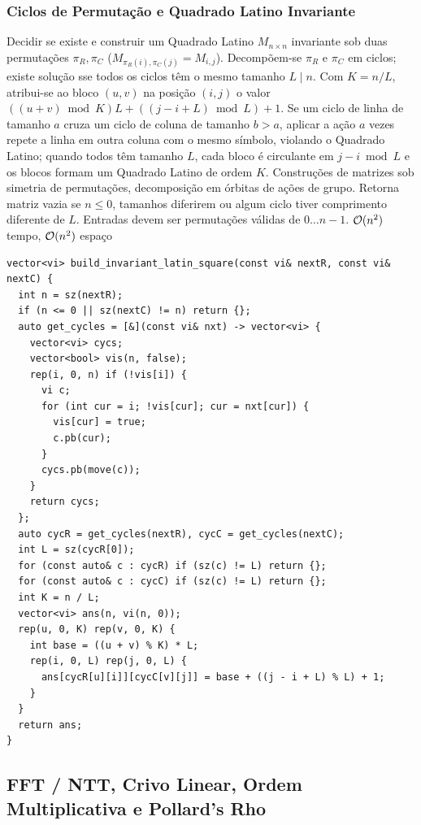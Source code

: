 \subsubsection{Ciclos de Permutação e Quadrado Latino Invariante}
\algobox
  {Decidir se existe e construir um Quadrado Latino $M_{n \times n}$ invariante sob duas permutações $\pi_R, \pi_C$ ($M_{\pi_R(i), \pi_C(j)} = M_{i,j}$).}
  {Decompõem-se $\pi_R$ e $\pi_C$ em ciclos; existe solução sse todos os ciclos têm o mesmo tamanho $L \mid n$. Com $K = n / L$, atribui-se ao bloco $(u, v)$ na posição $(i, j)$ o valor $((u + v) \bmod K) L + ((j - i + L) \bmod L) + 1$.}
  {Se um ciclo de linha de tamanho $a$ cruza um ciclo de coluna de tamanho $b > a$, aplicar a ação $a$ vezes repete a linha em outra coluna com o mesmo símbolo, violando o Quadrado Latino; quando todos têm tamanho $L$, cada bloco é circulante em $j - i \bmod L$ e os blocos formam um Quadrado Latino de ordem $K$.}
  {Construções de matrizes sob simetria de permutações, decomposição em órbitas de ações de grupo.}
  {Retorna matriz vazia se $n \le 0$, tamanhos diferirem ou algum ciclo tiver comprimento diferente de $L$. Entradas devem ser permutações válidas de $0 \dots n-1$.}
  {$\mathcal{O}(n^2)$ tempo, $\mathcal{O}(n^2)$ espaço}

\begin{lstlisting}
vector<vi> build_invariant_latin_square(const vi& nextR, const vi& nextC) {
  int n = sz(nextR);
  if (n <= 0 || sz(nextC) != n) return {};
  auto get_cycles = [&](const vi& nxt) -> vector<vi> {
    vector<vi> cycs;
    vector<bool> vis(n, false);
    rep(i, 0, n) if (!vis[i]) {
      vi c;
      for (int cur = i; !vis[cur]; cur = nxt[cur]) {
        vis[cur] = true;
        c.pb(cur);
      }
      cycs.pb(move(c));
    }
    return cycs;
  };
  auto cycR = get_cycles(nextR), cycC = get_cycles(nextC);
  int L = sz(cycR[0]);
  for (const auto& c : cycR) if (sz(c) != L) return {};
  for (const auto& c : cycC) if (sz(c) != L) return {};
  int K = n / L;
  vector<vi> ans(n, vi(n, 0));
  rep(u, 0, K) rep(v, 0, K) {
    int base = ((u + v) % K) * L;
    rep(i, 0, L) rep(j, 0, L) {
      ans[cycR[u][i]][cycC[v][j]] = base + ((j - i + L) % L) + 1;
    }
  }
  return ans;
}
\end{lstlisting}

\subsection{FFT / NTT, Crivo Linear, Ordem Multiplicativa e Pollard's Rho}

